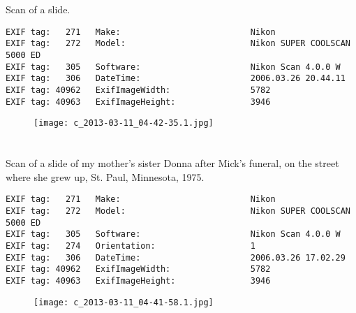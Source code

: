 
\clearpage
\section{\protect{}}
\noindent Scan of a slide.
\noindent
\begin{lstlisting}
EXIF tag:   271   Make:                          Nikon
EXIF tag:   272   Model:                         Nikon SUPER COOLSCAN 5000 ED
EXIF tag:   305   Software:                      Nikon Scan 4.0.0 W
EXIF tag:   306   DateTime:                      2006.03.26 20.44.11
EXIF tag: 40962   ExifImageWidth:                5782
EXIF tag: 40963   ExifImageHeight:               3946

\end{lstlisting}
\clearpage
\begin{figure}
\raggedleft
\texttt{[image: c\_2013-03-11\_04-42-35.1.jpg]}
\end{figure}


\clearpage
\section{\protect{}}
\noindent Scan of a slide of my mother's sister Donna after Mick's funeral, on the street where she grew up, St. Paul, Minnesota, 1975.
\noindent
\begin{lstlisting}
EXIF tag:   271   Make:                          Nikon
EXIF tag:   272   Model:                         Nikon SUPER COOLSCAN 5000 ED
EXIF tag:   305   Software:                      Nikon Scan 4.0.0 W
EXIF tag:   274   Orientation:                   1
EXIF tag:   306   DateTime:                      2006.03.26 17.02.29
EXIF tag: 40962   ExifImageWidth:                5782
EXIF tag: 40963   ExifImageHeight:               3946

\end{lstlisting}
\clearpage
\begin{figure}
\raggedleft
\texttt{[image: c\_2013-03-11\_04-41-58.1.jpg]}
\end{figure}


\clearpage
